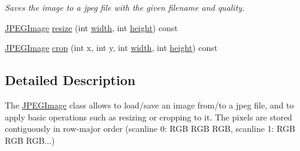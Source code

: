 \begin{DoxyCompactItemize}
\begin{DoxyCompactList}\small\item\em Saves the image to a jpeg file with the given {\ttfamily filename} and {\ttfamily quality}. \end{DoxyCompactList}\item 
\hyperlink{class_f_f_l_d_1_1_j_p_e_g_image}{J\-P\-E\-G\-Image} \hyperlink{class_f_f_l_d_1_1_j_p_e_g_image_a8e43979c7fff922528c689500ee49c5a}{resize} (int \hyperlink{class_f_f_l_d_1_1_j_p_e_g_image_a6876061ad7198120040466d332a46bdc}{width}, int \hyperlink{class_f_f_l_d_1_1_j_p_e_g_image_aa8a99643896fd76976cb6b1629d69746}{height}) const 
\item 
\hyperlink{class_f_f_l_d_1_1_j_p_e_g_image}{J\-P\-E\-G\-Image} \hyperlink{class_f_f_l_d_1_1_j_p_e_g_image_ad2e71e56f959b824e2e6a47a60bd2a17}{crop} (int x, int y, int \hyperlink{class_f_f_l_d_1_1_j_p_e_g_image_a6876061ad7198120040466d332a46bdc}{width}, int \hyperlink{class_f_f_l_d_1_1_j_p_e_g_image_aa8a99643896fd76976cb6b1629d69746}{height}) const 
\end{DoxyCompactItemize}


\subsection{Detailed Description}
The \hyperlink{class_f_f_l_d_1_1_j_p_e_g_image}{J\-P\-E\-G\-Image} class allows to load/save an image from/to a jpeg file, and to apply basic operations such as resizing or cropping to it. The pixels are stored contiguously in row-\/major order (scanline 0\-: R\-G\-B R\-G\-B R\-G\-B, scanline 1\-: R\-G\-B R\-G\-B R\-G\-B...) 


